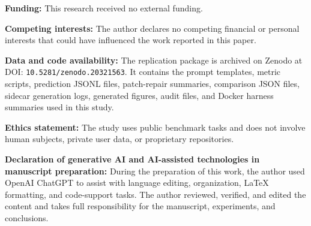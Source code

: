 \documentclass[preprint,12pt]{elsarticle}
\begin{document}
\noindent\textbf{Funding:} This research received no external funding.

\noindent\textbf{Competing interests:} The author declares no competing financial or personal interests that could have influenced the work reported in this paper.

\noindent\textbf{Data and code availability:} The replication package is archived on Zenodo at DOI: \texttt{10.5281/zenodo.20321563}. It contains the prompt templates, metric scripts, prediction JSONL files, patch-repair summaries, comparison JSON files, sidecar generation logs, generated figures, audit files, and Docker harness summaries used in this study.

\noindent\textbf{Ethics statement:} The study uses public benchmark tasks and does not involve human subjects, private user data, or proprietary repositories.

\noindent\textbf{Declaration of generative AI and AI-assisted technologies in manuscript preparation:} During the preparation of this work, the author used OpenAI ChatGPT to assist with language editing, organization, LaTeX formatting, and code-support tasks. The author reviewed, verified, and edited the content and takes full responsibility for the manuscript, experiments, and conclusions.
\end{document}
